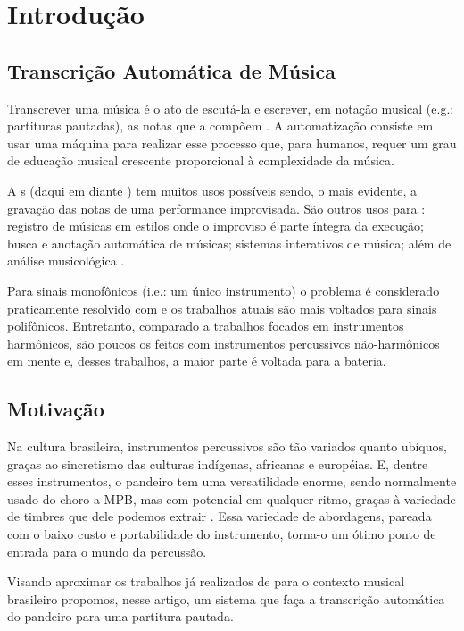 \documentclass[
  dissertacao,
  brazil
]{ThesisPUC}
\begin{document}

\chapter{Introdução}
\section{Transcrição Automática de Música}
Transcrever uma música é o ato de escutá-la e escrever, em notação musical (e.g.: partituras pautadas), as notas que a compõem \cite{martin1996blackboard}. A automatização consiste em usar uma máquina para realizar esse processo que, para humanos, requer um grau de educação musical crescente proporcional à complexidade da música.

A \tam s (daqui em diante \TAM) tem muitos usos possíveis sendo, o mais evidente, a gravação das notas de uma performance improvisada. São outros usos para \TAM: registro de músicas em estilos onde o improviso é parte íntegra da execução; busca e anotação automática de músicas; sistemas interativos de música; além de análise musicológica \cite{benetos2013automatic}.

Para sinais monofônicos (i.e.: um único instrumento) o problema é considerado praticamente resolvido com \cite{klapuri1998automatic} e os trabalhos atuais são mais voltados para sinais polifônicos. Entretanto, comparado a trabalhos focados em instrumentos harmônicos, são poucos os feitos com instrumentos percussivos não-harmônicos em mente e, desses trabalhos, a maior parte é voltada para a bateria. 

\section{Motivação}

Na cultura brasileira, instrumentos percussivos são tão variados quanto ubíquos, graças ao sincretismo das culturas indígenas, africanas e européias. E, dentre esses instrumentos, o pandeiro tem uma versatilidade enorme, sendo normalmente usado do choro a MPB, mas com potencial em qualquer ritmo, graças à variedade de timbres que dele podemos extrair \cite{magalhaes2016pandeiro}. Essa variedade de abordagens, pareada com o baixo custo e portabilidade do instrumento, torna-o um ótimo ponto de entrada para o mundo da percussão. 

Visando aproximar os trabalhos já realizados de \TAM para o contexto musical brasileiro propomos, nesse artigo, um sistema que faça a transcrição automática do pandeiro para uma partitura pautada.
\end{document}
